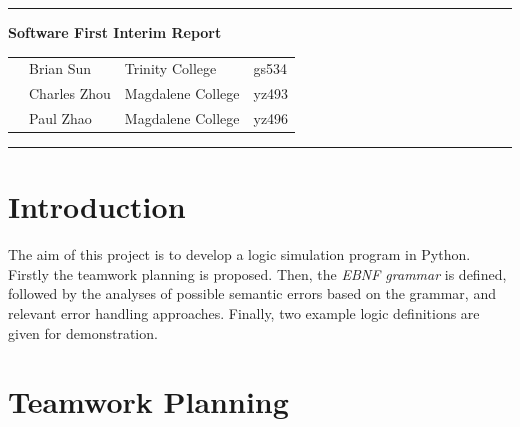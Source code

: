 \documentclass[12pt]{article}
\def\n{\noindent}
\begin{document}
\vspace{0.3cm}
\rule{15.7cm}{0.5mm}

\begin{center}
{\hspace{0.6cm}\Large \textbf {Software First Interim Report}\\
}
\end{center}
\begin{table}[H]
\centering
\begin{tabular}{ p{2cm}p{3cm}p{4cm} p{3cm}}
&Brian Sun & Trinity College & gs534 \\
&Charles Zhou & Magdalene College & yz493 \\
&Paul Zhao & Magdalene College & yz496 \\
\end{tabular}
\end{table}


\begin{center}
\rule{15.7cm}{0.5mm}
\end{center}

\section{Introduction}
\n The aim of this project is to develop a logic simulation program in Python. Firstly the teamwork planning is proposed. Then, the \textit{EBNF grammar} is defined, followed by the analyses of possible semantic errors based on the grammar, and relevant error handling approaches. Finally, two example logic definitions are given for demonstration.

\section{Teamwork Planning}

\end{document}
